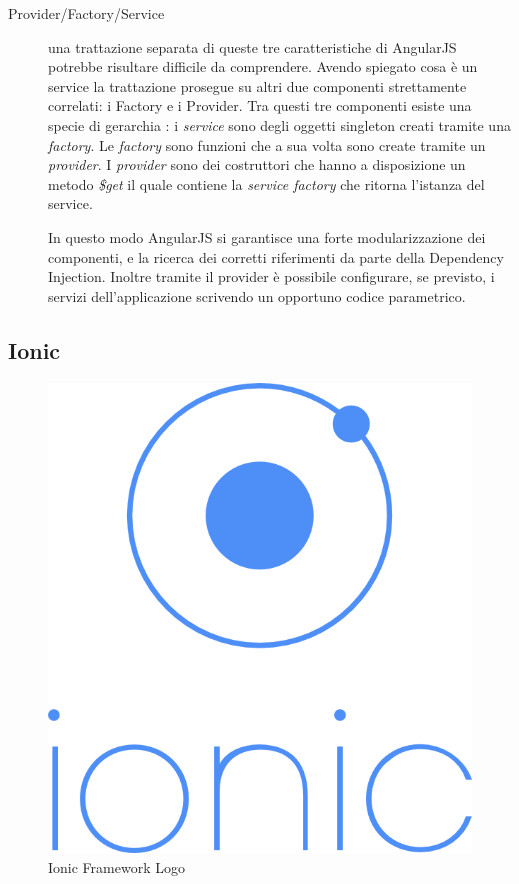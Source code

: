 \begin{description}
\item[Provider/Factory/Service] una trattazione separata di queste tre caratteristiche di AngularJS potrebbe risultare difficile da comprendere. Avendo spiegato cosa è un service la trattazione prosegue su altri due componenti strettamente correlati: i Factory e i Provider.
Tra questi tre componenti esiste una specie di gerarchia : i \textit{service} sono degli oggetti singleton creati tramite una \textit{factory}. Le \textit{factory} sono funzioni che a sua volta sono create tramite un \textit{provider}. I \textit{provider} sono dei costruttori che hanno a disposizione un metodo \emph{\$get} il quale contiene la \emph{service factory} che ritorna l'istanza del service.

In questo modo AngularJS si garantisce una forte modularizzazione dei componenti, e la ricerca dei corretti riferimenti da parte della Dependency Injection. Inoltre tramite il provider è possibile configurare, se previsto, i servizi dell'applicazione scrivendo un opportuno codice parametrico.

\end{description} 


\subsection{Ionic}

\begin{figure}
  \vspace{-65pt}
  \begin{center}
    \includegraphics[scale=0.35]{Figures/ionic-logo.png}
  \end{center}
  \vspace{-10pt}
  \caption{Ionic Framework Logo}
  \label{fig:IONIC}
  \vspace{-10pt}
\end{figure}

